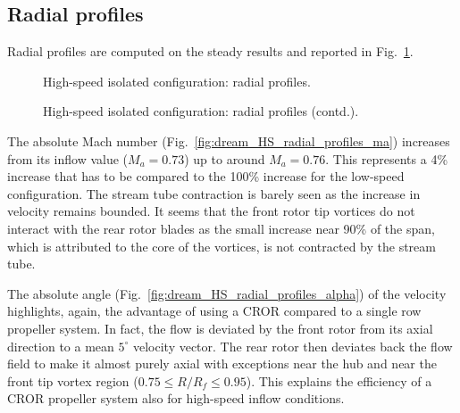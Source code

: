 \subsection{Radial profiles}
\label{sub:dream_hs_radial_profiles}

Radial profiles are computed on the steady results and 
reported in Fig.~\ref{fig:dream_HS_radial_profiles}.
\begin{figure}[htp]
  \centering
  \caption{High-speed isolated configuration: radial profiles.}
\end{figure}
\begin{figure}[htp]
  \centering
  \setcounter{subfigure}{3}
  \caption{High-speed isolated configuration: radial profiles (contd.).}
  \label{fig:dream_HS_radial_profiles}
\end{figure}

The absolute Mach number (Fig.~\ref{fig:dream_HS_radial_profiles_ma}) 
increases from its inflow
value ($M_a = 0.73$) up to around $M_a=0.76$. This represents
a 4\% increase that has to be compared to the 100\% increase
for the low-speed configuration. The stream tube contraction
is barely seen as the increase in velocity remains bounded.
It seems that the front rotor tip vortices do not interact
with the rear rotor blades as the small increase near 90\%
of the span, which is attributed to the core of the vortices,
is not contracted by the stream tube.

The absolute angle (Fig.~\ref{fig:dream_HS_radial_profiles_alpha}) 
of the velocity highlights, again, the advantage
of using a CROR compared to a single row propeller system. In fact,
the flow is deviated by the front rotor from its axial direction
to a mean $5^\circ$ velocity vector. The rear rotor then deviates
back the flow field to make it almost purely axial with exceptions
near the hub and near the front tip vortex region ($0.75 \leq R/R_f \leq 0.95$).
This explains the efficiency of a CROR propeller system also for high-speed
inflow conditions.

